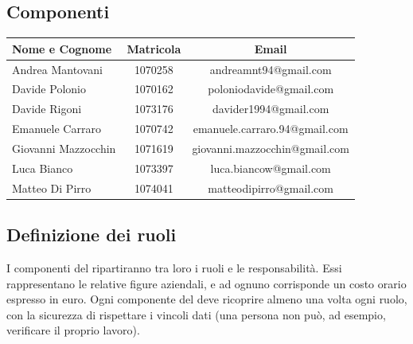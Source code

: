 \subsection*{Componenti}
\begin{center}
  \begin{tabular}{ l | c | c }
    \hline
    \textbf{Nome e Cognome} & \textbf{Matricola} & \textbf{Email} \\
    \hline
    Andrea Mantovani & 1070258 & andreamnt94@gmail.com \\ \hline
    Davide Polonio & 1070162 & poloniodavide@gmail.com \\ \hline
    Davide Rigoni & 1073176 & davider1994@gmail.com \\ \hline
    Emanuele Carraro & 1070742 & emanuele.carraro.94@gmail.com \\ \hline
    Giovanni Mazzocchin & 1071619 & giovanni.mazzocchin@gmail.com \\ \hline
    Luca Bianco & 1073397 & luca.biancow@gmail.com \\ \hline
    Matteo Di Pirro & 1074041 & matteodipirro@gmail.com \\
    \hline
  \end{tabular}
\end{center}



\subsection*{Definizione dei ruoli}
I componenti del  ripartiranno tra loro i ruoli e le responsabilit\`a. Essi rappresentano le relative figure aziendali, e ad ognuno corrisponde un costo orario espresso in euro.
Ogni componente del  deve ricoprire almeno una volta ogni ruolo, con la sicurezza di rispettare i vincoli dati (una persona non pu\`o, ad esempio, verificare il proprio lavoro).
